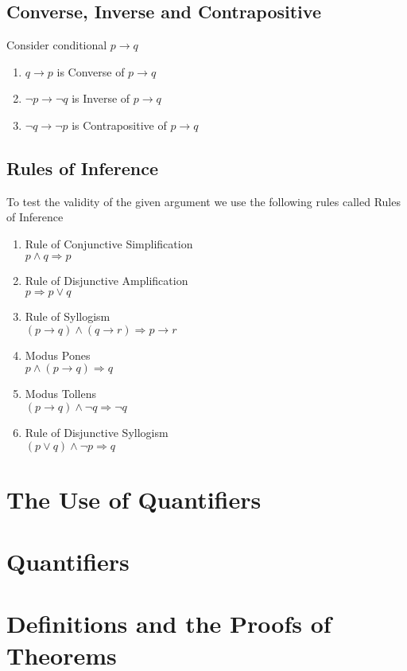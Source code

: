 \documentclass{article}
\begin{document}
	\subsection{Converse, Inverse and Contrapositive}
	Consider conditional $p\to q$
	\begin{enumerate}[label=\roman*)]
		\item $q\to p$ is Converse of $p\to q$
		\item $\neg p\to \neg q$ is Inverse of $p\to q$
		\item $\neg q\to \neg p$ is Contrapositive of $p\to q$
	\end{enumerate}

	\subsection{Rules of Inference}
	To test the validity of the given argument we use the following rules called Rules of Inference

	\begin{enumerate}[label=\roman*)]
		\item Rule of Conjunctive Simplification \\ $p\land q\Rightarrow p$
		\item Rule of Disjunctive Amplification \\ $p\Rightarrow p\lor q$
		\item Rule of Syllogism \\ $(p\to q)\land(q\to r)\Rightarrow p\to r$
		\item Modus Pones \\ $p\land(p\to q)\Rightarrow q$
		\item Modus Tollens \\ $(p\to q)\land\neg q\Rightarrow \neg q$
		\item Rule of Disjunctive Syllogism \\ $(p\lor q)\land\neg p\Rightarrow q$
	\end{enumerate}

	\section{The Use of Quantifiers}
	\section{Quantifiers}
	\section{Definitions and the Proofs of Theorems}
\end{document}
